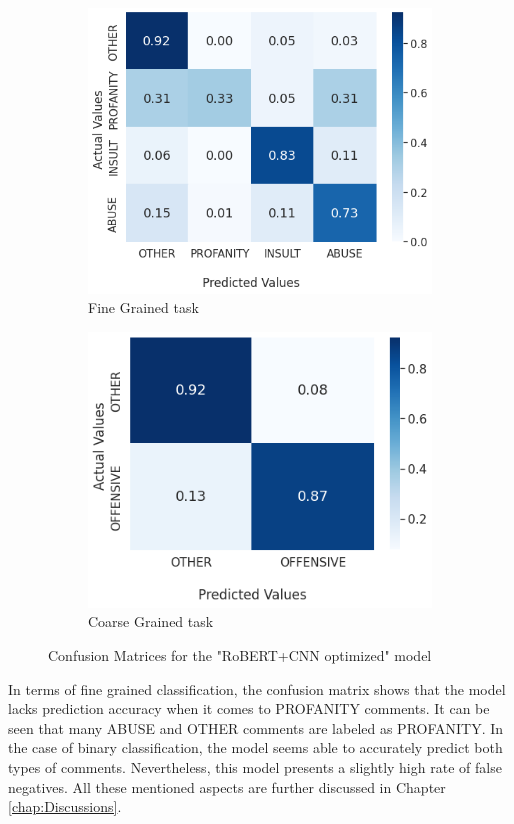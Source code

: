 \documentclass[12pt,a4paper]{report}
\begin{document}
\begin{figure}[H]
\begin{subfigure}{.5\textwidth}
  \centering
  \includegraphics[width=.8\linewidth]{pics/FG-NORMALIZED-BERT-CNN-FBRO.png}  
  \caption{Fine Grained task}
  \label{fig:FG-CM-BERT-CNN}
\end{subfigure}
\begin{subfigure}{.5\textwidth}
  \centering
  \includegraphics[width=.8\linewidth]{pics/CG-NORMALIZED-BERT-CNN-FBRO.png}  
  \caption{Coarse Grained task}
  \label{fig:CG-CM-BERT-CNN}
\end{subfigure}
\caption{Confusion Matrices for the "RoBERT+CNN optimized" model}
\label{fig:optimized-CM}
\end{figure}

In terms of fine grained classification, the confusion matrix shows that the model lacks prediction accuracy when it comes to PROFANITY comments. It can be seen that many ABUSE and OTHER comments are labeled as PROFANITY. In the case of binary classification, the model seems able to accurately predict both types of comments. Nevertheless, this model presents a slightly high rate of false negatives. All these mentioned aspects are further discussed in Chapter \ref{chap:Discussions}.
\end{document}
